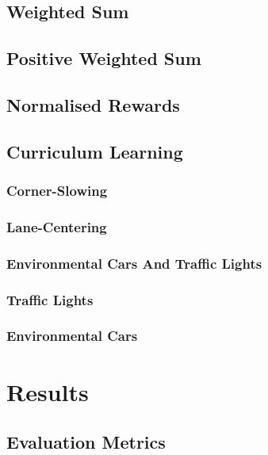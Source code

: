 \documentclass{article}
\begin{document}
\subsection{Weighted Sum}
\lipsum[2][1]

\subsection{Positive Weighted Sum}
\lipsum[2][1]

\subsection{Normalised Rewards}
\lipsum[2][1]

\subsection{Curriculum Learning}
\lipsum[2][1]

\subsubsection{Corner-Slowing}
\lipsum[2][1]

\subsubsection{Lane-Centering}
\lipsum[2][1]

\subsubsection{Environmental Cars And Traffic Lights}
\lipsum[2][1]

\subsubsection{Traffic Lights}
\lipsum[2][1]

\subsubsection{Environmental Cars}
\lipsum[2][1]

\section{Results}
\lipsum[2][1]

\subsection{Evaluation Metrics}
\lipsum[2][1]
\end{document}
